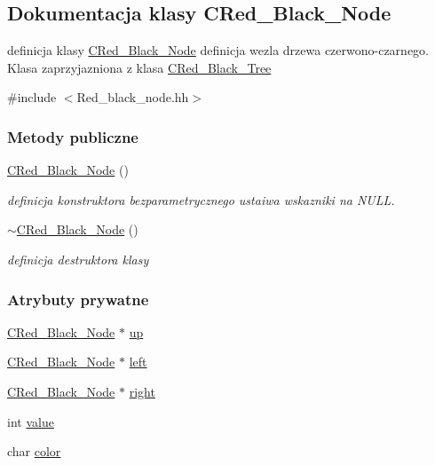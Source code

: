 \hypertarget{class_c_red___black___node}{}\subsection{Dokumentacja klasy C\+Red\+\_\+\+Black\+\_\+\+Node}
\label{class_c_red___black___node}


definicja klasy \hyperlink{class_c_red___black___node}{C\+Red\+\_\+\+Black\+\_\+\+Node} definicja wezla drzewa czerwono-\/czarnego. Klasa zaprzyjazniona z klasa \hyperlink{class_c_red___black___tree}{C\+Red\+\_\+\+Black\+\_\+\+Tree}  




{\ttfamily \#include $<$Red\+\_\+black\+\_\+node.\+hh$>$}

\subsubsection*{Metody publiczne}
\begin{DoxyCompactItemize}
\item 
\hyperlink{class_c_red___black___node_abd26297e376d5fafcf1c5d58e45beb7d}{C\+Red\+\_\+\+Black\+\_\+\+Node} ()
\begin{DoxyCompactList}\small\item\em definicja konstruktora bezparametrycznego ustaiwa wskazniki na N\+U\+L\+L. \end{DoxyCompactList}\item 
\hyperlink{class_c_red___black___node_a58a73435ad83d459535b75f9065ee19f}{$\sim$\+C\+Red\+\_\+\+Black\+\_\+\+Node} ()
\begin{DoxyCompactList}\small\item\em definicja destruktora klasy \end{DoxyCompactList}\end{DoxyCompactItemize}
\subsubsection*{Atrybuty prywatne}
\begin{DoxyCompactItemize}
\item 
\hyperlink{class_c_red___black___node}{C\+Red\+\_\+\+Black\+\_\+\+Node} $\ast$ \hyperlink{class_c_red___black___node_a9f94874dfcfe5827c5f9ceb1069b4625}{up}
\item 
\hyperlink{class_c_red___black___node}{C\+Red\+\_\+\+Black\+\_\+\+Node} $\ast$ \hyperlink{class_c_red___black___node_a1fa5a456940cae743b695a911b453a9e}{left}
\item 
\hyperlink{class_c_red___black___node}{C\+Red\+\_\+\+Black\+\_\+\+Node} $\ast$ \hyperlink{class_c_red___black___node_ad78478582f0ed7aacf4760f6b702a8a3}{right}
\item 
int \hyperlink{class_c_red___black___node_a3dd4ce06e4cbf460cd9a023b94b3751b}{value}
\item 
char \hyperlink{class_c_red___black___node_adf896441afd9751f86f7328443f13199}{color}
\end{DoxyCompactItemize}
